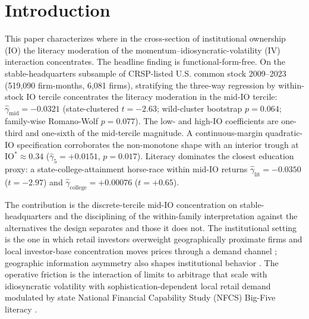 \section{Introduction}

This paper characterizes where in the cross-section of institutional ownership (IO) the literacy moderation of the momentum--idiosyncratic-volatility (IV) interaction concentrates. The headline finding is functional-form-free. On the stable-headquarters subsample of CRSP-listed U.S. common stock 2009--2023 (519,090 firm-months, 6,081 firms), stratifying the three-way regression by within-stock IO tercile concentrates the literacy moderation in the mid-IO tercile: $\hat\gamma_{\text{mid}} = -0.0321$ (state-clustered $t = -2.63$; wild-cluster bootstrap $p = 0.064$; family-wise Romano-Wolf $p = 0.077$). The low- and high-IO coefficients are one-third and one-sixth of the mid-tercile magnitude. A continuous-margin quadratic-IO specification corroborates the non-monotone shape with an interior trough at $\mathrm{IO}^{\ast} \approx 0.34$ ($\hat\gamma_{5} = +0.0151$, $p = 0.017$). Literacy dominates the closest education proxy: a state-college-attainment horse-race within mid-IO returns $\hat\gamma_{\text{lit}} = -0.0350$ ($t = -2.97$) and $\hat\gamma_{\text{college}} = +0.00076$ ($t = +0.65$).

The contribution is the discrete-tercile mid-IO concentration on stable-headquarters and the disciplining of the within-family interpretation against the alternatives the design separates and those it does not. The institutional setting is the one in which retail investors overweight geographically proximate firms \citep{covalMoskowitz1999, ivkovicWeisbenner2005} and local investor-base concentration moves prices through a demand channel \citep{hongKubikStein2008}; geographic information asymmetry also shapes institutional behavior \citep{bernileKumarSulaeman2015}. The operative friction is the interaction of limits to arbitrage that scale with idiosyncratic volatility \citep{shleiferVishny1997, pontiff2006} with sophistication-dependent local retail demand modulated by state National Financial Capability Study (NFCS) Big-Five literacy \citep{lusardiMitchell2014, calvetCampbellSodini2009, grinblattKeloharjuLinnainmaa2012}.

